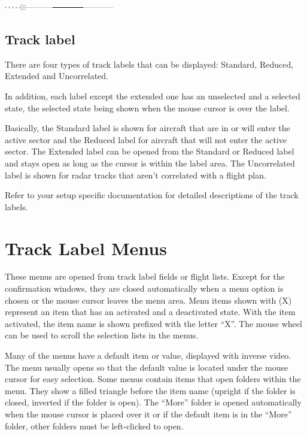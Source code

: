 \documentclass[11pt,a4paper]{memoir}
\begin{document}
\includegraphics{img/rps_predline+history_selected.png}

\subsection{Track label}
There are four types of track labels that can be displayed: Standard, Reduced, Extended and Uncorrelated.

In addition, each label except the extended one has an unselected and a selected state, the selected state
being shown when the mouse cursor is over the label.
\medskip

Basically, the Standard label is shown for aircraft that are in or will enter the active sector and the Reduced
label for aircraft that will not enter the active sector. The Extended label can be opened from the Standard
or Reduced label and stays open as long as the cursor is within the label area. The Uncorrelated label is
shown for radar tracks that aren’t correlated with a flight plan.
\medskip

Refer to your setup specific documentation for detailed descriptions of the track labels.\\

\section{Track Label Menus}
These menus are opened from track label fields or flight lists. Except for the confirmation windows, they
are closed automatically when a menu option is chosen or the mouse cursor leaves the menu area. Menu
items shown with (X) represent an item that has an activated and a deactivated state. With the item
activated, the item name is shown prefixed with the letter “X”. The mouse wheel can be used to scroll the
selection lists in the menus.

Many of the menus have a default item or value, displayed with inverse video. The menu usually opens so
that the default value is located under the mouse cursor for easy selection. Some menus contain items that
open folders within the menu. They show a filled triangle before the item name (upright if the folder is
closed, inverted if the folder is open). The “More” folder is opened automatically when the mouse cursor is
placed over it or if the default item is in the “More” folder, other folders must be left-clicked to open.\\
\end{document}
